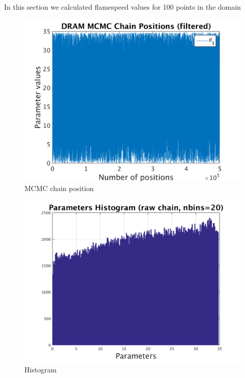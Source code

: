 In this section we calculated flamespeed values for 100 points in the domain 
\begin{figure}[h!]
  
  \centering
   \includegraphics[scale=0.75]{output_100/simple_ip_chain_pos_filt}
   \caption{MCMC chain position }
\end{figure}
%
%
\begin{figure}[h!]
  
  \centering
   \includegraphics[scale=0.75]{output_100/simple_ip_hist_raw}
   \caption{Histogram}
\end{figure}
%
%
%
